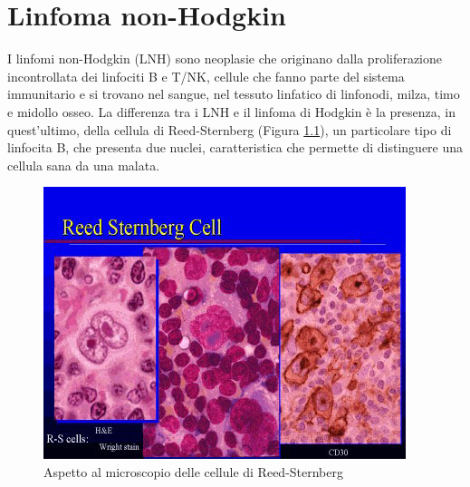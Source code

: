 \chapter{Linfoma non-Hodgkin}

I linfomi non-Hodgkin (LNH) sono neoplasie che originano dalla proliferazione incontrollata dei linfociti B e T/NK, 
cellule che fanno parte del sistema immunitario e si trovano nel sangue, nel tessuto linfatico di linfonodi, milza, 
timo e midollo osseo\cite{LNHAIL}. La differenza tra i LNH e il linfoma di Hodgkin è la presenza, in quest'ultimo,
della cellula di Reed-Sternberg (Figura \ref{fig:FIGURE_2.2}), un particolare tipo di linfocita B, che presenta due nuclei, 
caratteristica che permette di distinguere una cellula sana da una malata\cite{LNHAIMAC}.

\begin{figure}[H]
    \begin{center}
    \includegraphics[width=0.4\columnwidth]{img/Reed-Sternberg.jpeg}
    \vspace{-3mm}
    \end{center}
    \caption{Aspetto al microscopio delle cellule di Reed-Sternberg
    \cite{MSD}}
    \label{fig:FIGURE_2.2}
\end{figure}

